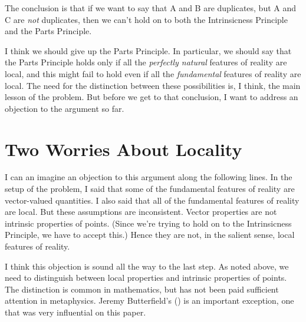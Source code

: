 \documentclass[
  11pt,
  letterpaper,
  DIV=11,
  numbers=noendperiod,
  twoside]{scrartcl}
\begin{document}
The conclusion is that if we want to say that A and B are duplicates,
but A and C are \emph{not} duplicates, then we can't hold on to both the
Intrinsicness Principle and the Parts Principle.

I think we should give up the Parts Principle. In particular, we should
say that the Parts Principle holds only if all the \emph{perfectly
natural} features of reality are local, and this might fail to hold even
if all the \emph{fundamental} features of reality are local. The need
for the distinction between these possibilities is, I think, the main
lesson of the problem. But before we get to that conclusion, I want to
address an objection to the argument so far.

\section{Two Worries About Locality}\label{two-worries-about-locality}

I can an imagine an objection to this argument along the following
lines. In the setup of the problem, I said that some of the fundamental
features of reality are vector-valued quantities. I also said that all
of the fundamental features of reality are local. But these assumptions
are inconsistent. Vector properties are not intrinsic properties of
points. (Since we're trying to hold on to the Intrinsicness Principle,
we have to accept this.) Hence they are not, in the salient sense, local
features of reality.

I think this objection is sound all the way to the last step. As noted
above, we need to distinguish between local properties and intrinsic
properties of points. The distinction is common in mathematics, but has
not been paid sufficient attention in metaphysics. Jeremy Butterfield's
() is an important exception, one
that was very influential on this paper.
\end{document}
